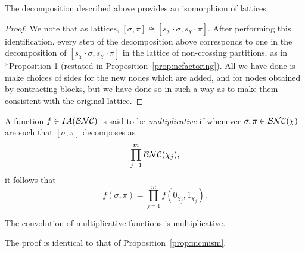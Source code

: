 % 
% 
\begin{proposition}
	The decomposition described above provides an isomorphism of lattices.
\end{proposition}

\begin{proof}
	We note that as lattices, $[\sigma, \pi] \cong [s_\chi\cdot\sigma, s_\chi\cdot\pi]$.
	After performing this identification, every step of the decomposition above corresponds to one in the decomposition of $[s_\chi\cdot\sigma, s_\chi\cdot\pi]$ in the lattice of non-crossing partitions, as in \cite{speicher1994}*{Proposition 1} (restated in Proposition~\ref{prop:ncfactoring}).
	All we have done is make choices of sides for the new nodes which are added, and for nodes obtained by contracting blocks, but we have done so in such a way as to make them consistent with the original lattice.
\end{proof}

\begin{definition}
	A function $f \in IA(\mathcal{BNC})$ is said to be \emph{multiplicative} if whenever $\sigma, \pi \in \mathcal{BNC}(\chi)$ are such that $[\sigma, \pi]$ decomposes as
	$$\prod_{j=1}^m \mathcal{BNC}(\chi_j),$$
	it follows that
	$$f(\sigma, \pi) = \prod_{j=1}^m f(0_{\chi_j}, 1_{\chi_j}).$$
\end{definition}

\begin{lemma}
	The convolution of multiplicative functions is multiplicative.
\end{lemma}
The proof is identical to that of Proposition~\ref{prop:mcmism}.

